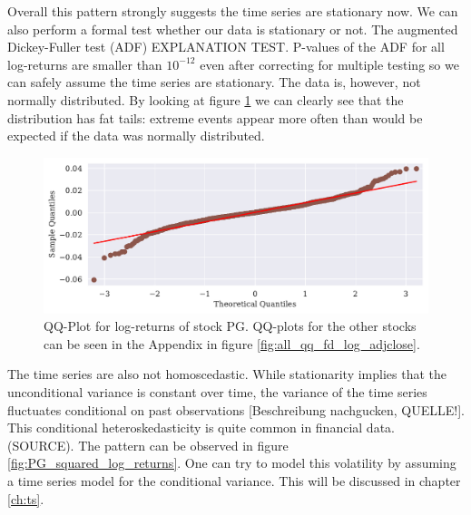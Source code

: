 \begin{table}[h!]
    \centering
    \begin{adjustbox}{width = 0.95\linewidth}
    
    \end{adjustbox}
    \caption{}
    \label{tab:log return means}
\end{table}{}

Overall this pattern strongly suggests the time series are stationary now. We can also perform a formal test whether our data is stationary or not. The augmented Dickey-Fuller test (ADF) EXPLANATION TEST. P-values of the ADF for all log-returns are smaller than $10^{-12}$ even after correcting for multiple testing so we can safely assume the time series are stationary. The data is, however, not normally distributed. By looking at figure \ref{fig:PG_qq_fd_log_adjclose} we can clearly see that the distribution has fat tails: extreme events appear more often than would be expected if the data was normally distributed. 

\begin{figure}[h]
    \centering
    \begin{adjustbox}{width=.9\textwidth,center}
    \includegraphics[]{figures/PG_log_adjclose_fd_and_qq.pdf}
    \end{adjustbox}  
    \caption{QQ-Plot for log-returns of stock PG. QQ-plots for the other stocks can be seen in the Appendix in figure \ref{fig:all_qq_fd_log_adjclose}.}
    \label{fig:PG_qq_fd_log_adjclose}
\end{figure}{}

The time series are also not homoscedastic. While stationarity implies that the unconditional variance is constant over time, the variance of the time series fluctuates conditional on past observations [Beschreibung nachgucken, QUELLE!]. This conditional heteroskedasticity is quite common in financial data. (SOURCE). The pattern can be observed in figure \ref{fig:PG_squared_log_returns}. One can try to model this volatility by assuming a time series model for the conditional variance. This will be discussed in chapter \ref{ch:ts}. %

